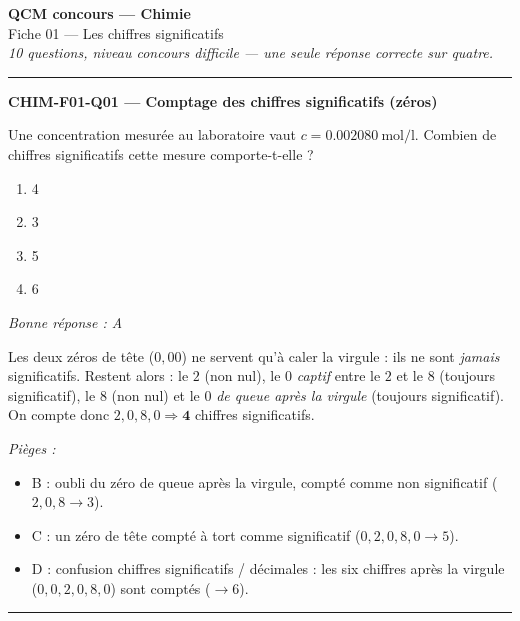 \documentclass[11pt,a4paper]{article}
\begin{document}
\begin{center}
{\Large\bfseries QCM concours --- Chimie}\\[2pt]
{\large Fiche 01 --- Les chiffres significatifs}\\[2pt]
\textit{10 questions, niveau concours difficile --- une seule réponse correcte sur quatre.}
\end{center}
\vspace{6pt}\hrule\vspace{10pt}

\noindent\textbf{CHIM-F01-Q01 --- Comptage des chiffres significatifs (zéros)}\par
Une concentration mesurée au laboratoire vaut $c = \qty{0.002080}{\mol\per\litre}$. Combien de chiffres significatifs cette mesure comporte-t-elle ?
\begin{enumerate}[label=\Alph*)]
\item \num{4}
\item \num{3}
\item \num{5}
\item \num{6}
\end{enumerate}
\textit{Bonne réponse : A}\par
Les deux zéros de tête ($0{,}00$) ne servent qu'à caler la virgule : ils ne sont \emph{jamais} significatifs. Restent alors : le $2$ (non nul), le $0$ \emph{captif} entre le $2$ et le $8$ (toujours significatif), le $8$ (non nul) et le $0$ \emph{de queue après la virgule} (toujours significatif). On compte donc $2,0,8,0 \Rightarrow \mathbf{4}$ chiffres significatifs.\par
\textit{Pièges :}
\begin{itemize}
\item B : oubli du zéro de queue après la virgule, compté comme non significatif ($2,0,8 \to 3$).
\item C : un zéro de tête compté à tort comme significatif ($0,2,0,8,0 \to 5$).
\item D : confusion chiffres significatifs / décimales : les six chiffres après la virgule ($0,0,2,0,8,0$) sont comptés ($\to 6$).
\end{itemize}
\vspace{6pt}\hrule\vspace{8pt}
\end{document}
